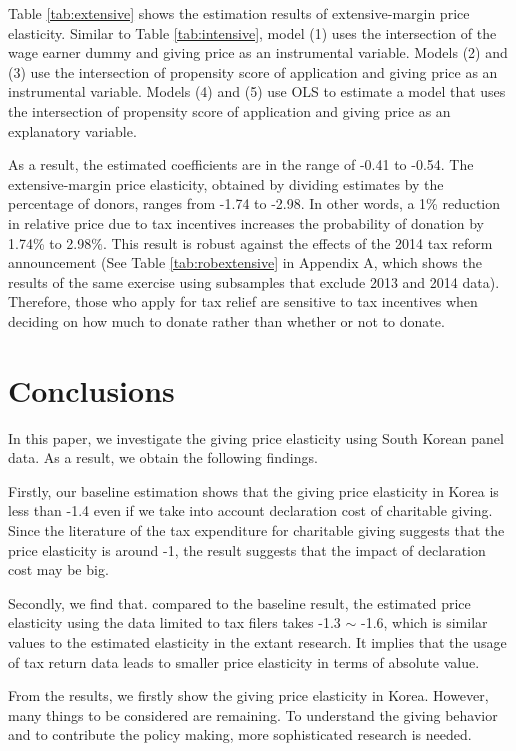 \documentclass[
  11pt,
  a4paper,
]{article}
\begin{document}
Table \ref{tab:extensive} shows
the estimation results of extensive-margin price elasticity.
Similar to Table \ref{tab:intensive},
model (1) uses the intersection of the wage earner dummy and
giving price as an instrumental variable.
Models (2) and (3) use the intersection of propensity score of application
and giving price as an instrumental variable.
Models (4) and (5) use OLS to estimate a model that
uses the intersection of propensity score of application and
giving price as an explanatory variable.

As a result, the estimated coefficients are in the range of -0.41 to -0.54.
The extensive-margin price elasticity,
obtained by dividing estimates by the percentage of donors,
ranges from -1.74 to -2.98.
In other words,
a 1\% reduction in relative price due to tax incentives increases
the probability of donation by 1.74\% to 2.98\%.
This result is robust against
the effects of the 2014 tax reform announcement
(See Table \ref{tab:robextensive} in Appendix A,
which shows the results of the same exercise
using subsamples that exclude 2013 and 2014 data).
Therefore,
those who apply for tax relief are sensitive to tax incentives
when deciding on how much to donate rather than whether or not to donate.

\hypertarget{conclusions}{%
\section{Conclusions}\label{conclusions}}

In this paper, we investigate the giving price elasticity using South Korean panel data. As a result, we obtain the following findings.

Firstly, our baseline estimation shows that the giving price elasticity in Korea is less than -1.4 even if we take into account declaration cost of charitable giving. Since the literature of the tax expenditure for charitable giving suggests that the price elasticity is around -1, the result suggests that the impact of declaration cost may be big.

Secondly, we find that. compared to the baseline result, the estimated price elasticity using the data limited to tax filers takes -1.3 \(\sim\) -1.6, which is similar values to the estimated elasticity in the extant research. It implies that the usage of tax return data leads to smaller price elasticity in terms of absolute value.

From the results, we firstly show the giving price elasticity in Korea. However, many things to be considered are remaining. To understand the giving behavior and to contribute the policy making, more sophisticated research is needed.
\end{document}
